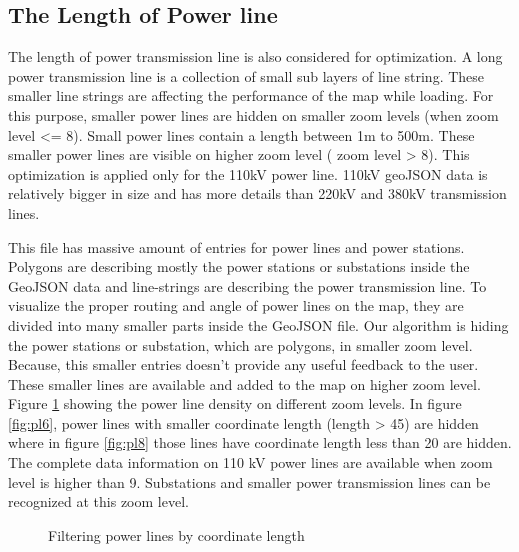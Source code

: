\subsection{The Length of Power line}

The length of power transmission line is also considered for optimization. A long power transmission line is a collection of small sub layers of line string. These smaller line strings are affecting the performance of the map while loading.  For this purpose, smaller power lines are hidden on smaller zoom levels (when zoom level <= 8).  Small power lines contain a length between 1m to 500m. These smaller power lines are visible on higher zoom level ( zoom level > 8). This optimization is applied only for the 110kV power line. 110kV geoJSON data is relatively bigger in size and has more details than 220kV and 380kV transmission lines. 

This file has massive amount of entries for power lines and power stations. Polygons are describing mostly the power stations or substations inside the GeoJSON data and line-strings are describing the power transmission line. To visualize the proper routing and angle of power lines on the map, they are divided into many smaller parts inside the GeoJSON file. Our algorithm is hiding the power stations or substation, which are polygons, in smaller zoom level. Because, this smaller entries doesn't provide any useful feedback to the user. These smaller lines are available and added to the map on higher zoom level. Figure \ref{fig:plfilter} showing the power line density on different zoom levels. In figure \ref{fig:pl6}, power lines with smaller coordinate length (length > 45) are hidden where in figure \ref{fig:pl8} those lines have coordinate length less than 20 are hidden. The complete data information on 110 kV power lines are available when zoom level is higher than 9. Substations and smaller power transmission lines can be recognized at this zoom level. 

\begin{figure}
  \begin{center}
\hfill
{}
\hfill
\caption{Filtering power lines by coordinate length}
\label{fig:plfilter}
\end{center}
\end{figure}

